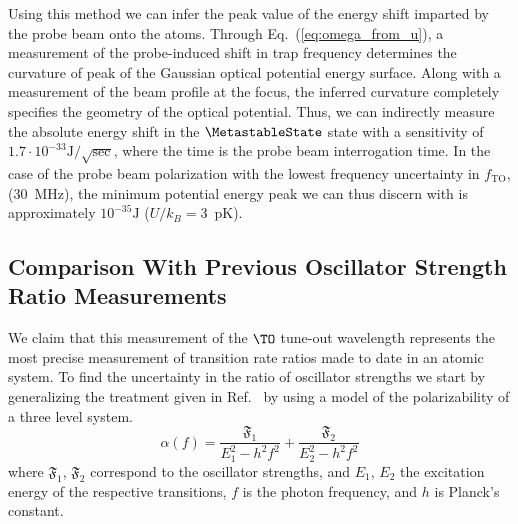 	Using this method we can infer the peak value of the energy shift imparted by the probe beam onto the atoms. Through Eq.~(\ref{eq:omega_from_u}), a measurement of the probe-induced shift in trap frequency determines the curvature of peak of the Gaussian optical potential energy surface. Along with a measurement of the beam profile at the focus, the inferred curvature completely specifies the geometry of the optical potential. Thus, we can indirectly measure the absolute energy shift in the $\MetastableState$ state with a sensitivity of $1.7\cdot10^{-33}\mathrm{J}/\sqrt{\mathrm{sec}}$, where the time is the probe beam interrogation time. In the case of the probe beam polarization with the lowest frequency uncertainty in $f_\textrm{TO}$, (30~MHz), the minimum potential energy peak we can thus discern with is approximately $10^{-35}\mathrm{J}$ ($U/k_B=3$~pK).

\subsection{Comparison With Previous Oscillator Strength Ratio Measurements}
	We claim that this measurement of the $\TO$ tune-out wavelength represents the most precise measurement of transition rate ratios made to date in an atomic system. To find the uncertainty in the ratio of oscillator strengths we start by generalizing the treatment given in Ref.~\cite{Mitroy13} by using a model of the polarizability of a three level system.
	\begin{equation}
	\alpha(f) = \frac{\mathfrak{F}_1}{E_1^2-h^2 f^2}+\frac{\mathfrak{F}_2}{E_2^2-h^2 f^2}
	\end{equation}
	where $\mathfrak{F}_1$, $\mathfrak{F}_2$ correspond to the oscillator strengths, and $E_1$, $E_2$ the excitation energy of the respective transitions, $f$ is the photon frequency, and \(h\) is Planck's constant. 

